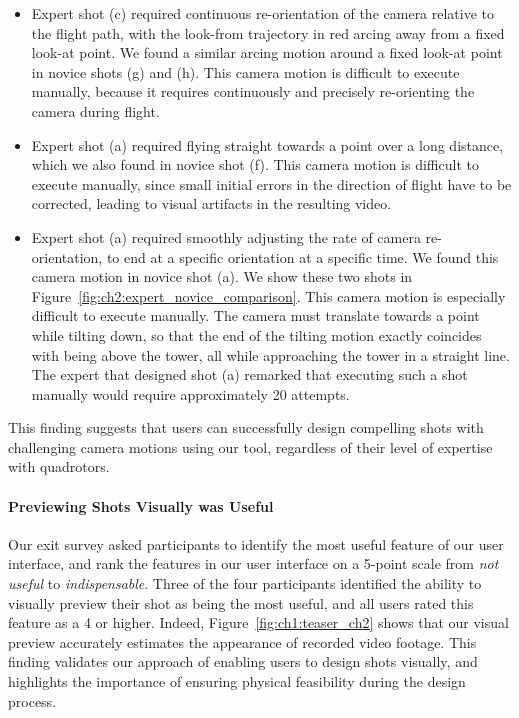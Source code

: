\begin{itemize}

\item
Expert shot (c) required continuous re-orientation of the camera relative to the flight path, with the look-from trajectory in red arcing away from a fixed look-at point.
We found a similar arcing motion around a fixed look-at point in novice shots (g) and (h).
This camera motion is difficult to execute manually, because it requires continuously and precisely re-orienting the camera during flight.

\item
Expert shot (a) required flying straight towards a point over a long distance, which we also found in novice shot (f).
This camera motion is difficult to execute manually, since small initial errors in the direction of flight have to be corrected, leading to visual artifacts in the resulting video.

\item
Expert shot (a) required smoothly adjusting the rate of camera re-orientation, to end at a specific orientation at a specific time.
We found this camera motion in novice shot (a).
We show these two shots in Figure~\ref{fig:ch2:expert_novice_comparison}.
This camera motion is especially difficult to execute manually.
The camera must translate towards a point while tilting down, so that the end of the tilting motion exactly coincides with being above the tower, all while approaching the tower in a straight line.
The expert that designed shot (a) remarked that executing such a shot manually would require approximately 20 attempts.

\end{itemize}

This finding suggests that users can successfully design compelling shots with challenging camera motions using our tool, regardless of their level of expertise with quadrotors.

\paragraph{Previewing Shots Visually was Useful}
Our exit survey asked participants to identify the most useful feature of our user interface, and rank the features in our user interface on a 5-point scale from \emph{not useful} to \emph{indispensable}.
Three of the four participants identified the ability to visually preview their shot as being the most useful, and all users rated this feature as a 4 or higher.
Indeed, Figure~\ref{fig:ch1:teaser_ch2} shows that our visual preview accurately estimates the appearance of recorded video footage.
This finding validates our approach of enabling users to design shots visually, and highlights the importance of ensuring physical feasibility during the design process.

